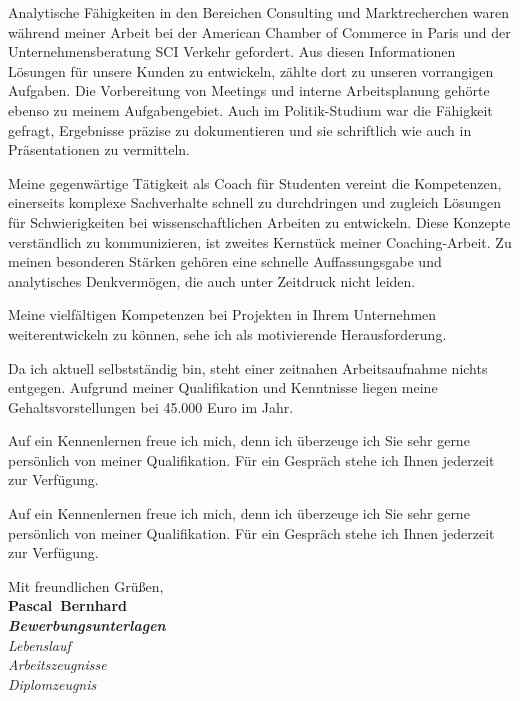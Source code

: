 \documentclass[11pt,a4paper]{article}
\def\firstname{Pascal}
\def\familyname{Bernhard}
\begin{document}
Analytische Fähigkeiten in den Bereichen Consulting und Marktrecherchen waren während meiner Arbeit bei der American Chamber of Commerce in Paris und der Unternehmensberatung SCI Verkehr gefordert. Aus diesen Informationen Lösungen für unsere Kunden zu entwickeln, zählte dort zu unseren vorrangigen Aufgaben. Die Vorbereitung von Meetings und interne Arbeitsplanung gehörte ebenso zu meinem Aufgabengebiet. Auch im Politik-Studium war die Fähigkeit gefragt, Ergebnisse präzise zu dokumentieren und sie schriftlich wie auch in Präsentationen zu vermitteln. 

Meine gegenwärtige Tätigkeit als Coach für Studenten vereint die Kompetenzen, einerseits komplexe Sachverhalte schnell zu durchdringen und zugleich Lösungen für Schwierigkeiten bei wissenschaftlichen Arbeiten zu entwickeln. Diese Konzepte verständlich zu kommunizieren, ist zweites Kernstück meiner Coaching-Arbeit. Zu meinen besonderen Stärken gehören eine schnelle Auffassungsgabe und analytisches Denkvermögen, die auch unter Zeitdruck nicht leiden.



Meine vielfältigen Kompetenzen bei Projekten in Ihrem Unternehmen weiterentwickeln zu können, sehe ich als motivierende Herausforderung.


Da ich aktuell selbstständig bin, steht einer zeitnahen Arbeitsaufnahme nichts entgegen. Aufgrund meiner Qualifikation und Kenntnisse liegen meine Gehaltsvorstellungen bei 45.000 Euro im Jahr.



Auf ein Kennenlernen freue ich mich, denn ich überzeuge ich Sie sehr gerne persönlich von meiner Qualifikation. Für ein Gespräch stehe ich Ihnen jederzeit zur Verfügung.


\newpage

Auf ein Kennenlernen freue ich mich, denn ich überzeuge ich Sie sehr gerne persönlich von meiner Qualifikation. Für ein Gespräch stehe ich Ihnen jederzeit zur Verfügung.


  
Mit freundlichen Grüßen,\\[3em] %
%
{\bfseries \firstname~\familyname}\\
%
\vfill%
{\slshape \bfseries Bewerbungsunterlagen}\\
 {\slshape Lebenslauf\\
 Arbeitszeugnisse\\
 Diplomzeugnis{}}
\end{document}

